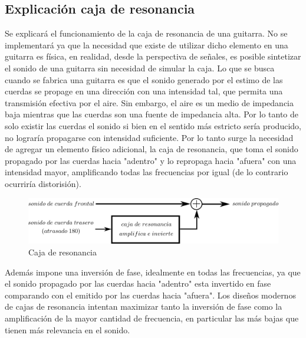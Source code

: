 \documentclass[assd_tp2_main.tex]{subfiles}
\begin{document}
\subsection{Explicación caja de resonancia}
Se explicará el funcionamiento de la caja de resonancia de una guitarra. No se implementará ya que la necesidad que existe de utilizar dicho elemento en una guitarra es física, en realidad, desde la perspectiva de señales, es posible sintetizar el sonido de una guitarra sin necesidad de simular la caja.
Lo que se busca cuando se fabrica una guitarra es que el sonido generado por el estimo de las cuerdas se propage en una dirección con una intensidad tal, que permita una transmisión efectiva por el aire.
Sin embargo, el aire es un medio de impedancia baja mientras que las cuerdas son una fuente de impedancia alta. Por lo tanto de solo existir las cuerdas el sonido si bien en el sentido más estricto sería producido, no lograría propagarse con intensidad suficiente. 
Por lo tanto surge la necesidad de agregar un elemento físico adicional, la caja de resonancia, que toma el sonido propagado por las cuerdas hacia "adentro" y lo repropaga hacia "afuera" con una intensidad mayor, amplificando todas las frecuencias por igual (de lo contrario ocurriría distorisión). 
\begin{figure}[H]
	\begin{center}
	\includegraphics[scale=1.2]{graficos/caja_resonancia.png}
	\caption{Caja de resonancia}

	\end{center}
\end{figure}
Además impone una inversión de fase, idealmente en todas las frecuencias, ya que el sonido propagado por las cuerdas hacia "adentro" esta invertido en fase comparando con el emitido por las cuerdas hacia "afuera".
Los diseños modernos de cajas de resonancia intentan maximizar tanto la inversión de fase como la amplificación de la mayor cantidad de frecuencia, en particular las más bajas que tienen más relevancia en el sonido.
\end{document}
